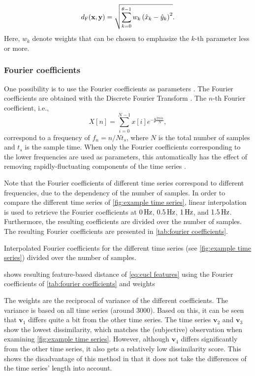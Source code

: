 \documentclass[10pt,final,a4paper,oneside,onecolumn]{article}
\newcommand{\imagi}{\textbf{j}}
\newcommand{\profile}[1]{\textbf{v}_{#1}}
\theoremstyle{plain}\newtheorem{definition}{Definition}[section]    %
\theoremstyle{definition}\newtheorem{example}{Example}[section]     %
\theoremstyle{remark}\newtheorem{remarkenv}{Remark}[section]        %
\begin{document}
\begin{equation}\label{eq:eucl features}
	d_{\textup{F}}(\textbf{x}, \textbf{y}) = \sqrt{ \sum_{k=0}^{\theta-1} w_k \left( \hat{x}_k - \hat{y}_k \right)^2 }.
\end{equation}
Here, $w_k$ denote weights that can be chosen to emphasize the $k$-th parameter less or more. 


\subsubsection{Fourier coefficients}
\label{sec:fourier coefficient}
One possibility is to use the Fourier coefficients as parameters \cite{agrawal1993similarity, faloutsos1994fast}. The Fourier coefficients are obtained with the Discrete Fourier Transform \cite{oppenheim1999discrete}. The $n$-th Fourier coefficient, i.e.,
\begin{equation}
	X[n] = \sum_{i=0}^{N-1} x[i] e^{-\imagi\frac{2\pi i n}{N}},
\end{equation}
correspond to a frequency of $f_n = n/Nt_s$, where $N$ is the total number of samples and $t_s$ is the sample time. When only the Fourier coefficients corresponding to the lower frequencies are used as parameters, this automatically has the effect of removing rapidly-fluctuating components of the time series \cite{serra2014empirical}.

Note that the Fourier coefficients of different time series correspond to different frequencies, due to the dependency of the number of samples. In order to compare the different time series of \cref{fig:example time series}, linear interpolation is used to retrieve the Fourier coefficients at $\unit[0]{Hz}$, $\unit[0.5]{Hz}$, $\unit[1]{Hz}$, and $\unit[1.5]{Hz}$. Furthermore, the resulting coefficients are divided over the number of samples. The resulting Fourier coefficients are presented in \cref{tab:fourier coefficients}.

\begin{table}
	\centering
	\caption{Interpolated Fourier coefficients for the different time series (see \cref{fig:example time series}) divided over the number of samples.}
	\label{tab:fourier coefficients}
	
\end{table}

 shows resulting feature-based distance of \cref{eq:eucl features} using the Fourier coefficients of \cref{tab:fourier coefficients} and weights 
 
The weights are the reciprocal of variance of the different coefficients. The variance is based on all time series (around 3000). 
Based on this, it can be seen that $\profile{1}$ differs quite a bit from the other time series. The time series $\profile{2}$ and $\profile{3}$ show the lowest dissimilarity, which matches the (subjective) observation when examining \cref{fig:example time series}. However, although $\profile{4}$ differs significantly from the other time series, it also gets a relatively low dissimilarity score. This shows the disadvantage of this method in that it does not take the differences of the time series' length into account.
\end{document}
